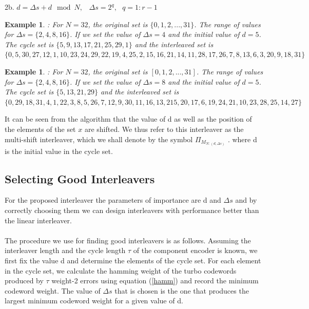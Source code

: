 \documentclass[20 pts]{article}
\newtheorem{example}[theorem]{Example}
\begin{document}
 2b. $d=\Delta s +d \mod N, \,\,\,\,\, \Delta s =2^q, \,\,\,\, q=1:r-1$
 
 
 \begin{example}
 \label{E1}
 : For $N=32$, the original set is $\{0,1,2,...,31\}$. The range of values for 
 $\Delta s = \{ 2,4,8,16\}$.  If we set the value
 of $\Delta s = 4$ and the initial value of $d=5$. 
 The cycle set is $\{ 5,9,13,17,21,25,29,1\}$ and the interleaved set is 
$\{0,5,30,27,12,1,10,23,24,29,22,19, 4, 25 ,2,15 ,16,21,14,11, 28,17,
  26, 7, 8, 13, 6, 3, 20, 9, 18, 31\}$
 \end{example}
 
  \begin{example}
  \label{E2}
 : For $N=32$, the original set is $[0,1,2,...,31]$. The range of values for 
 $\Delta s = \{ 2,4,8,16\}$.  If we set the value
 of $\Delta s = 8$ and the initial value of $d=5$. 
 The cycle set is $\{ 5,13,21,29\}$ and the interleaved set is 
  $\{0, 29, 18, 31, 4, 1, 22, 3, 8, 5, 26, 7, 12, 9, 30, 11, 16, 13, 2
  15, 20, 17, 6, 19, 24, 21, 10, 23, 28,25, 14, 27\}$
 
 \end{example}
 It can be seen from the algorithm that the value of d as well as the position of the 
 elements of the set $x$ are shifted. We thus refer to this interleaver as the multi-shift 
 interleaver, which we shall denote by the symbol $\Pi_{\mathit{M}_{N:(d,\Delta s)}}$ .
 where d is the initial value in the cycle set.

 \subsection{Selecting Good Interleavers}
 For the proposed interleaver the parameters of importance are d and $\Delta s$ and
 by correctly choosing them we can design interleavers with performance better
 than the linear interleaver. 
  \paragraph{}
 The procedure we use for finding good interleavers is as follows. Assuming
 the interleaver length and the cycle length $\tau$ of the component 
 encoder is known, we first fix the value d and determine the elements of the cycle set.
 For each element in the cycle set, we calculate the hamming weight of the 
 turbo codewords 
 produced by $\tau$ weight-2 errors
 using equation (\ref{hamm}) and record the minimum codeword weight. 
 The value of 
 $\Delta s$ that is chosen is the one that produces the largest minimum codeword 
 weight
 for a given value of d. 
 
\end{document}
